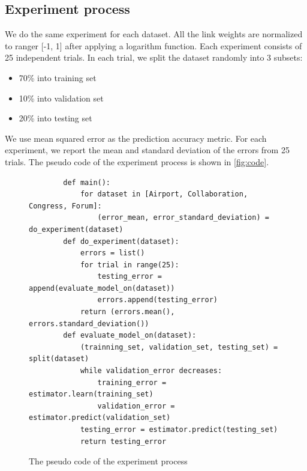 \documentclass[conference]{IEEEtran}
\begin{document}
\subsection{Experiment process}
We do the same experiment for each dataset.
All the link weights are normalized to ranger [-1, 1] after applying a logarithm function.
Each experiment consists of 25 independent trials.
In each trial, we split the dataset randomly into 3 subsets:
\begin{itemize}
	\item 70\% into training set
	\item 10\% into validation set
	\item 20\% into testing set
\end{itemize}
We use mean squared error as the prediction accuracy metric.
For each experiment, we report the mean and standard deviation of the errors from 25 trials.
The pseudo code of the experiment process is shown in \autoref{fig:code}.
\begin{figure}[!htb]\centering
	\begin{lstlisting}
		def main():
			for dataset in [Airport, Collaboration, Congress, Forum]:
				(error_mean, error_standard_deviation) = do_experiment(dataset)
		def do_experiment(dataset):
			errors = list()
			for trial in range(25):
				testing_error = append(evaluate_model_on(dataset))
				errors.append(testing_error)
			return (errors.mean(), errors.standard_deviation())
		def evaluate_model_on(dataset):
			(trainning_set, validation_set, testing_set) = split(dataset)
			while validation_error decreases:
				training_error = estimator.learn(training_set)
				validation_error = estimator.predict(validation_set)
			testing_error = estimator.predict(testing_set)
			return testing_error
	\end{lstlisting}
	\caption{The pseudo code of the experiment process}
	\label{fig:code}
\end{figure}
\end{document}
